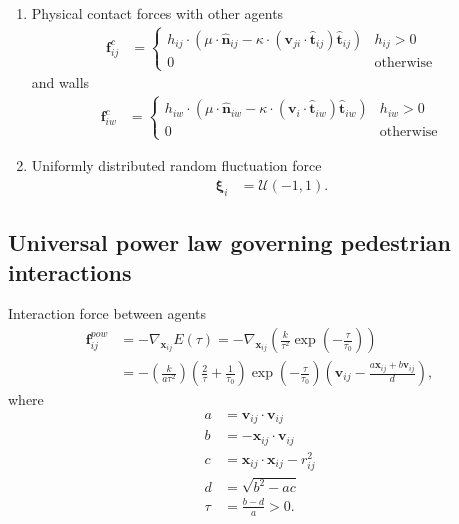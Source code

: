 \begin{enumerate}[label=\roman{enumi})]
\item 
Physical contact forces with other agents 
\begin{align}
\mathbf{f}_{ij}^{c} &= 
\begin{cases}
h_{ij} \cdot \left(\mu \cdot \hat{\mathbf{n}}_{ij} - \kappa \cdot \left(\mathbf{v}_{ji} \cdot \hat{\mathbf{t}}_{ij}\right) \hat{\mathbf{t}}_{ij}\right) & h_{ij} > 0 \\
0 & \text{otherwise}
\end{cases}
\end{align}
and walls
\begin{align}
\mathbf{f}_{iw}^{c} &= 
\begin{cases}
h_{iw} \cdot \left(\mu \cdot \hat{\mathbf{n}}_{iw} - \kappa \cdot (\mathbf{v}_{i} \cdot \hat{\mathbf{t}}_{iw}) \hat{\mathbf{t}}_{iw}\right) & h_{iw} > 0 \\
0 & \text{otherwise}
\end{cases}
\end{align}


\item 
Uniformly distributed random fluctuation force
\begin{align}
\boldsymbol{\xi}_{i} &= \boldsymbol{\mathcal{U}}(-1, 1).
\end{align}


\end{enumerate}


\subsection{Universal power law governing pedestrian interactions}
Interaction force between agents
\begin{align}
\mathbf{f}_{ij}^{pow} &= -\nabla_{\mathbf{x}_{ij}} E(\tau) 
= -\nabla_{\mathbf{x}_{ij}} \left(\frac{k}{\tau^{2}} \exp \left( -\frac{\tau}{\tau_{0}} \right) \right) \\
&= - \left(\frac{k}{a \tau^{2}}\right) 
\left(\frac{2}{\tau} + \frac{1}{\tau_{0}}\right) 
\exp\left (-\frac{\tau}{\tau_{0}}\right )
\left(\mathbf{v}_{ij} -\frac{a \mathbf{x}_{ij} + b \mathbf{v}_{ij}}{d} \right),
\end{align}
where
\begin{align}
a &= \mathbf{v}_{ij} \cdot \mathbf{v}_{ij} \\
b &= -\mathbf{x}_{ij} \cdot \mathbf{v}_{ij} \\
c &= \mathbf{x}_{ij} \cdot \mathbf{x}_{ij} - r_{ij}^{2} \\
d &= \sqrt{b^{2} - a c} \\
\tau &= \frac{b - d}{a} > 0.
\end{align}
